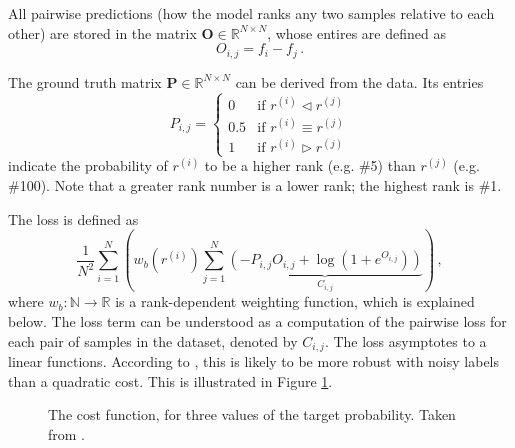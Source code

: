 All pairwise predictions (how the model ranks any two samples relative to each other) are stored in the matrix $\bm{O}\in\mathbb{R}^{N\times N}$, whose entires are defined as
\begin{equation}\label{eq:outputmatrix}
    O_{i,j}=f_i-f_j\,.
\end{equation}

The ground truth matrix $\bm{P}\in\mathbb{R}^{N\times N}$ can be derived from the data. Its entries\begin{equation}\label{eq:groundtruthmatrix}
    P_{i,j}=\begin{cases}
        0&\text{if }r^{(i)}\triangleleft r^{(j)}\\
        0.5&\text{if }r^{(i)}\equiv r^{(j)}\\
        1&\text{if }r^{(i)}\triangleright r^{(j)}
    \end{cases}
\end{equation}indicate the probability of $r^{(i)}$ to be a higher rank (e.g. \#5) than $r^{(j)}$ (e.g. \#100). Note that a greater rank number is a lower rank; the highest rank is \#1.

The loss is defined as
\begin{equation}
    \label{eq:loss}
    \frac{1}{N^2}\sum_{i=1}^N\left(
        w_b\left(r^{(i)}\right)\sum_{j=1}^N
            \underbrace{\left(-P_{i,j}O_{i,j}+\log\left(1+e^{\displaystyle O_{i,j}}\right)\right)}_{C_{i,j}}
    \right)\,,
\end{equation}where $w_b:\mathbb{N}\rightarrow\mathbb{R}$ is a rank-dependent weighting function, which is explained below. The loss term can be understood as a computation of the pairwise loss for each pair of samples in the dataset, denoted by $C_{i,j}$. The loss asymptotes to a linear functions. According to \cite{Burges:learningtorankwithsgd}, this is likely to be more robust with noisy labels than a quadratic cost. This is illustrated in Figure \ref{fig:costfn}.

\begin{figure}\centering
    \caption[The cost function, for three values of the target probability]{The cost function, for three values of the target probability. Taken from \cite{Burges:learningtorankwithsgd}.}\label{fig:costfn}
\end{figure}

